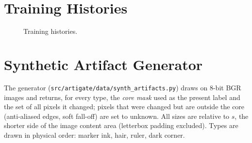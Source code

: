 \documentclass[10pt,a4paper]{article}
\begin{document}
\section{Training Histories}\label{sec:s-histories}
\begin{figure}[H]
\centering
{}
\caption{Training histories. }
\label{fig:s-histories}
\end{figure}

\section{Synthetic Artifact Generator}\label{sec:s-generator}
The generator (\texttt{src/artigate/data/synth\_artifacts.py}) draws on 8-bit BGR images and returns, for every type, the \emph{core mask} used as the present label and the set of all pixels it changed; pixels that were changed but are outside the core (anti-aliased edges, soft fall-off) are set to unknown. All sizes are relative to $s$, the shorter side of the image content area (letterbox padding excluded). Types are drawn in physical order: marker ink, hair, ruler, dark corner.
\end{document}

